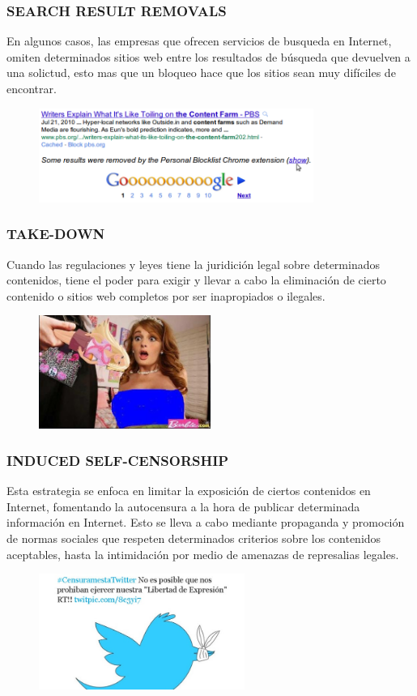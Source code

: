 \documentclass{beamer}
\begin{document}
\frame
{
\transdissolve[duration=0.2]
\frametitle{SEARCH RESULT REMOVALS}
En algunos casos, las empresas que ofrecen servicios de busqueda en Internet, omiten determinados sitios web entre los resultados de b\'usqueda que devuelven a una solictud, esto mas que un bloqueo hace que los sitios sean muy dif\'iciles de encontrar.
\begin{figure}
  \centering
    \includegraphics[width=0.8\textwidth]{rm_q.png}
  \label{fig:ejemplo}
\end{figure}
}

\frame
{
\transdissolve[duration=0.2]
\frametitle{TAKE-DOWN}
Cuando las regulaciones y leyes tiene la juridici\'on legal sobre determinados contenidos, tiene el poder para exigir y llevar a cabo la eliminaci\'on de cierto contenido o sitios web completos por ser inapropiados o ilegales.
\begin{figure}
  \centering
    \includegraphics[width=0.5\textwidth]{ps_2.jpg}
  \label{fig:ejemplo}
\end{figure}
}

\frame
{
\transdissolve[duration=0.2]
\frametitle{INDUCED SELF-CENSORSHIP}
Esta estrategia se enfoca en limitar la exposici\'on de ciertos contenidos en Internet, fomentando la autocensura a la hora de publicar determinada informaci\'on en Internet. Esto se lleva a cabo mediante propaganda y promoci\'on de normas sociales que respeten determinados criterios sobre los contenidos aceptables, hasta la intimidaci\'on por medio de amenazas de represalias legales.
\begin{figure}
  \centering
    \includegraphics[width=0.6\textwidth]{cens_tw.jpg}
  \label{fig:ejemplo}
\end{figure}
}
\end{document}

